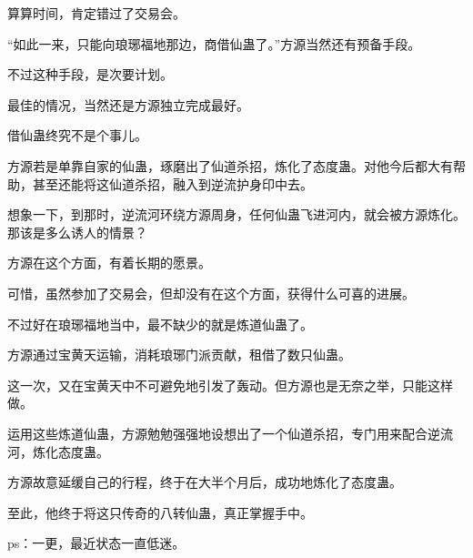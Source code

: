 \begin{this_body}
算算时间，肯定错过了交易会。

“如此一来，只能向琅琊福地那边，商借仙蛊了。”方源当然还有预备手段。

不过这种手段，是次要计划。

最佳的情况，当然还是方源独立完成最好。

借仙蛊终究不是个事儿。

方源若是单靠自家的仙蛊，琢磨出了仙道杀招，炼化了态度蛊。对他今后都大有帮助，甚至还能将这仙道杀招，融入到逆流护身印中去。

想象一下，到那时，逆流河环绕方源周身，任何仙蛊飞进河内，就会被方源炼化。那该是多么诱人的情景？

方源在这个方面，有着长期的愿景。

可惜，虽然参加了交易会，但却没有在这个方面，获得什么可喜的进展。

不过好在琅琊福地当中，最不缺少的就是炼道仙蛊了。

方源通过宝黄天运输，消耗琅琊门派贡献，租借了数只仙蛊。

这一次，又在宝黄天中不可避免地引发了轰动。但方源也是无奈之举，只能这样做。

运用这些炼道仙蛊，方源勉勉强强地设想出了一个仙道杀招，专门用来配合逆流河，炼化态度蛊。

方源故意延缓自己的行程，终于在大半个月后，成功地炼化了态度蛊。

至此，他终于将这只传奇的八转仙蛊，真正掌握手中。

ps：一更，最近状态一直低迷。

\end{this_body}

